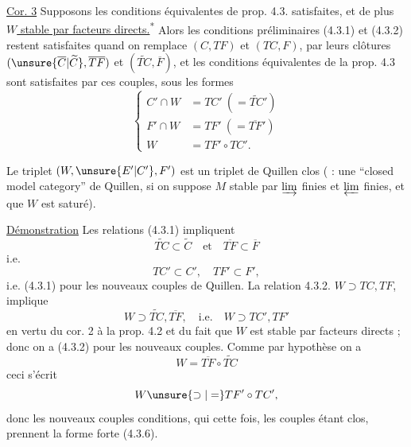 \uline{Cor. 3} Supposons les conditions équivalentes  de prop. 4.3. satisfaites, et de plus \uline{$W$ stable par facteurs directs.}\textsuperscript{*} Alors les conditions préliminaires (4.3.1) et (4.3.2) restent satisfaites quand on remplace $(C,TF)$ et $(TC,F)$, par leurs clôtures  $(\unsure{\overline C|\widetilde C},\overline{TF})$ et  $(\widetilde{TC},\overline F)$, et les conditions  équivalentes de la prop. 4.3 sont  satisfaites par ces couples, sous les formes 
\[
\left\{\begin{aligned}
C'\cap W&=TC'\ (=\widetilde{TC}')\\
F'\cap W&=TF'\ (=\overline{TF}')\\
W&=TF'\circ TC'.
\end{aligned}\right.
\tag*{(4.3.6)}
\]

Le triplet $(W,\unsure{E'|C'},F')$ est un triplet de Quillen clos ( : une ``closed model category'' de Quillen,  si on suppose $M$ stable par $\varinjlim$ finies et $\varprojlim$ finies, et que $W$  est  saturé).

\uline{Démonstration} Les relations (4.3.1) impliquent
\[
\widetilde{TC}\subset\widetilde C\quad\text{et}\quad\overline{TF}\subset\overline F
\]
i.e.
\[
TC'\subset C',\quad TF'\subset F',
\]
i.e. (4.3.1) pour les nouveaux couples de Quillen. La relation 4.3.2. $W\supset TC,TF$, implique
\[
W\supset\widetilde{TC},\overline{TF},\quad\text{i.e.}\quad W\supset TC',TF'
\]
en vertu du cor. 2 à la prop. 4.2 et du fait que $W$ est stable par facteurs directs ;  donc on a (4.3.2) pour les nouveaux couples. Comme par hypothèse on a
\[
W=\overline{TF}\circ\widetilde{TC}
\]
ceci s'écrit
\[
W\unsure{\supset|=}TF'\circ TC',
\]
donc les nouveaux couples    conditions, qui cette fois, les couples étant clos, prennent la forme forte (4.3.6).

